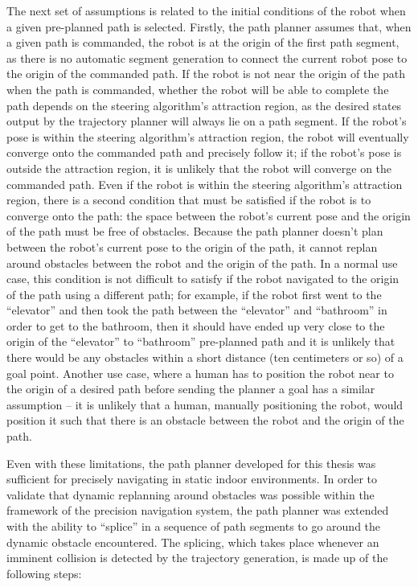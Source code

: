 The next set of assumptions is related to the initial conditions of the robot when a given pre-planned path is selected. Firstly, the path planner assumes that, when a given path is commanded, the robot is at the origin of the first path segment, as there is no automatic segment generation to connect the current robot pose to the origin of the commanded path. If the robot is not near the origin of the path when the path is commanded, whether the robot will be able to complete the path depends on the steering algorithm's attraction region, as the desired states output by the trajectory planner will always lie on a path segment. If the robot's pose is within the steering algorithm's attraction region, the robot will eventually converge onto the commanded path and precisely follow it; if the robot's pose is outside the attraction region, it is unlikely that the robot will converge on the commanded path. Even if the robot is within the steering algorithm's attraction region, there is a second condition that must be satisfied if the robot is to converge onto the path: the space between the robot's current pose and the origin of the path must be free of obstacles. Because the path planner doesn't plan between the robot's current pose to the origin of the path, it cannot replan around obstacles between the robot and the origin of the path. In a normal use case, this condition is not difficult to satisfy if the robot navigated to the origin of the path using a different path; for example, if the robot first went to the ``elevator'' and then took the path between the ``elevator'' and ``bathroom'' in order to get to the bathroom, then it should have ended up very close to the origin of the ``elevator'' to ``bathroom'' pre-planned path and it is unlikely that there would be any obstacles within a short distance (ten centimeters or so) of a goal point. Another use case, where a human has to position the robot near to the origin of a desired path before sending the planner a goal has a similar assumption -- it is unlikely that a human, manually positioning the robot, would position it such that there is an obstacle between the robot and the origin of the path.

Even with these limitations, the path planner developed for this thesis was sufficient for precisely navigating in static indoor environments. In order to validate that dynamic replanning around obstacles was possible within the framework of the precision navigation system, the path planner was extended with the ability to ``splice'' in a sequence of path segments to go around the dynamic obstacle encountered. The splicing, which takes place whenever an imminent collision is detected by the trajectory generation, is made up of the following steps:

